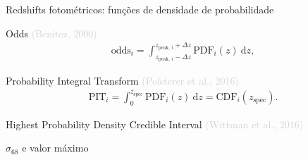 \begin{frame}[c]{Redshifts fotométricos: funções de densidade de probabilidade}

    \begin{splusbox}{Odds \textcolor{LightGray}{(Benitez, 2000)}}
        \small
        \vspace{-.5cm}
        \begin{align*}
          \text{odds}_i = \int_{z_\text{peak, $i$}-\Delta z}^{z_\text{peak, $i$}+\Delta z} \text{PDF}_i(z)~\text{d}z,
        \end{align*}
    \end{splusbox}

    \begin{splusbox}{Probability Integral Transform \textcolor{LightGray}{(Polsterer et al., 2016)}}
        \small
        \vspace{-.5cm}
        \begin{align*}
            \text{PIT}_i = \int_{0}^{z_\text{spec}} \text{PDF}_i(z)~\text{d}z = \text{CDF}_i(z_\text{spec}).
          \end{align*}
    \end{splusbox}

    \centering
    \begin{tcolorbox}[hbox]
        \small
        Highest Probability Density Credible Interval \textcolor{LightGray}{(Wittman et al., 2016)}
    \end{tcolorbox}

    \begin{tcolorbox}[hbox]
        \small
        $\sigma_{68}$ e valor máximo
    \end{tcolorbox}

\end{frame}

